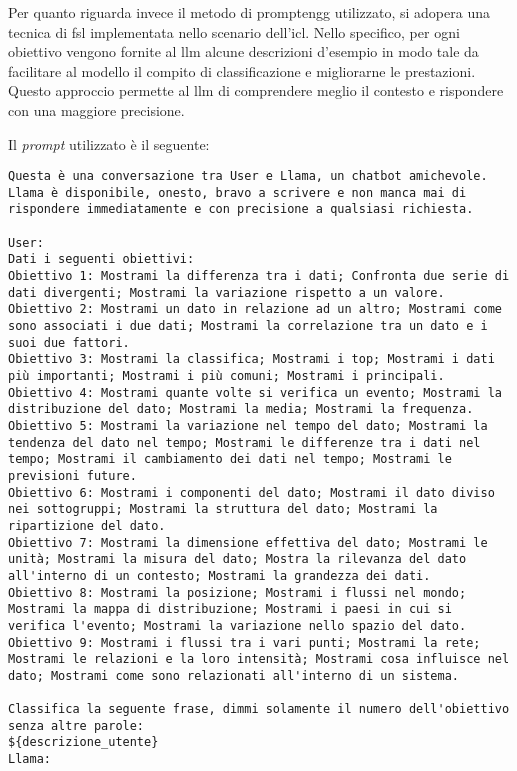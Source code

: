 \bigskip
\noindent Per quanto riguarda invece il metodo di \gls{promptengg} utilizzato, si adopera una tecnica di \gls{fsl} implementata nello scenario dell'\gls{icl}.
Nello specifico, per ogni obiettivo vengono fornite al \gls{llm} alcune descrizioni d'esempio in modo tale da facilitare al modello il compito di classificazione e migliorarne le
prestazioni. Questo approccio permette al \gls{llm} di comprendere meglio il contesto e rispondere con una maggiore precisione.

Il \emph{prompt} utilizzato è il seguente:
\begin{lstlisting}[style=htmlcssjs]
Questa è una conversazione tra User e Llama, un chatbot amichevole. Llama è disponibile, onesto, bravo a scrivere e non manca mai di rispondere immediatamente e con precisione a qualsiasi richiesta.

User: 
Dati i seguenti obiettivi:
Obiettivo 1: Mostrami la differenza tra i dati; Confronta due serie di dati divergenti; Mostrami la variazione rispetto a un valore.
Obiettivo 2: Mostrami un dato in relazione ad un altro; Mostrami come sono associati i due dati; Mostrami la correlazione tra un dato e i suoi due fattori.
Obiettivo 3: Mostrami la classifica; Mostrami i top; Mostrami i dati più importanti; Mostrami i più comuni; Mostrami i principali.
Obiettivo 4: Mostrami quante volte si verifica un evento; Mostrami la distribuzione del dato; Mostrami la media; Mostrami la frequenza.
Obiettivo 5: Mostrami la variazione nel tempo del dato; Mostrami la tendenza del dato nel tempo; Mostrami le differenze tra i dati nel tempo; Mostrami il cambiamento dei dati nel tempo; Mostrami le previsioni future.
Obiettivo 6: Mostrami i componenti del dato; Mostrami il dato diviso nei sottogruppi; Mostrami la struttura del dato; Mostrami la ripartizione del dato.
Obiettivo 7: Mostrami la dimensione effettiva del dato; Mostrami le unità; Mostrami la misura del dato; Mostra la rilevanza del dato all'interno di un contesto; Mostrami la grandezza dei dati.
Obiettivo 8: Mostrami la posizione; Mostrami i flussi nel mondo; Mostrami la mappa di distribuzione; Mostrami i paesi in cui si verifica l'evento; Mostrami la variazione nello spazio del dato.
Obiettivo 9: Mostrami i flussi tra i vari punti; Mostrami la rete; Mostrami le relazioni e la loro intensità; Mostrami cosa influisce nel dato; Mostrami come sono relazionati all'interno di un sistema. 

Classifica la seguente frase, dimmi solamente il numero dell'obiettivo senza altre parole: 
${descrizione_utente}
Llama:
\end{lstlisting}

